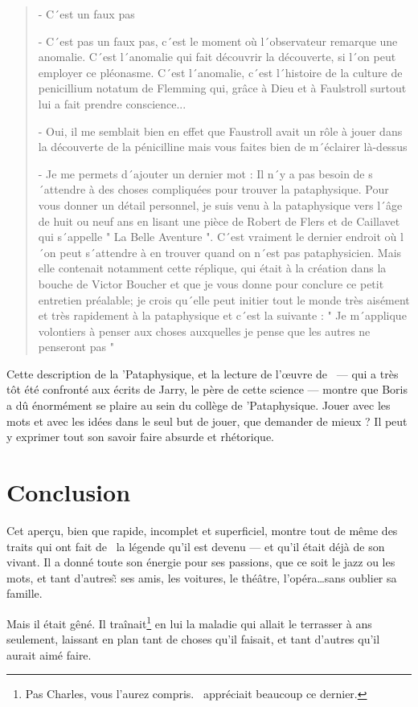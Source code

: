 {\begin{quotation}
- C´est un faux pas

- C´est pas un faux pas, c´est le moment où l´observateur remarque une anomalie. C´est l´anomalie qui fait découvrir la découverte, si l´on peut employer ce pléonasme. C´est l´anomalie, c´est l´histoire de la culture de penicillium notatum de Flemming qui, grâce à Dieu et à Faulstroll surtout lui a fait prendre conscience...

- Oui, il me semblait bien en effet que Faustroll avait un rôle à jouer dans la découverte de la pénicilline mais vous faites bien de m´éclairer là-dessus

- Je me permets d´ajouter un dernier mot : Il n´y a pas besoin de s´attendre à des choses compliquées pour trouver la pataphysique. Pour vous donner un détail personnel, je suis venu à la pataphysique vers l´âge de huit ou neuf ans en lisant une pièce de Robert de Flers et de Caillavet qui s´appelle " La Belle Aventure ". C´est vraiment le dernier endroit où l´on peut s´attendre à en trouver quand on n´est pas pataphysicien. Mais elle contenait notamment cette réplique, qui était à la création dans la bouche de Victor Boucher et que je vous donne pour conclure ce petit entretien préalable; je crois qu´elle peut initier tout le monde très aisément et très rapidement à la pataphysique et c´est la suivante : " Je m´applique volontiers à penser aux choses auxquelles je pense que les autres ne penseront pas "

\end{quotation}
} 

Cette description de la 'Pataphysique, et la lecture de l'\oe{}uvre de \BV\ --- qui a très tôt été
confronté aux écrits de Jarry, le père de cette science --- montre que Boris a dû énormément
se plaire au sein du collège de 'Pataphysique. Jouer avec les mots et avec les
idées dans le seul but de jouer, que demander de mieux ? Il peut y exprimer tout
son savoir faire absurde et rhétorique.


\section*{Conclusion}

Cet aperçu, bien que rapide, incomplet et superficiel, montre tout de même des traits qui ont fait de \BV\ la
légende qu'il est devenu --- et qu'il était déjà de son vivant. Il a donné toute son énergie pour ses passions,
que ce soit le jazz ou les mots, et tant d'autres\~: ses amis, les voitures, le théâtre, l'opéra\ldots sans
oublier sa famille.

Mais il était gêné. Il traînait\footnote{Pas Charles, vous l'aurez compris. \BV\ appréciait beaucoup ce dernier.}
en lui la maladie qui allait le terrasser à  ans seulement, laissant en plan tant de choses qu'il faisait,
et tant d'autres qu'il aurait aimé faire.

